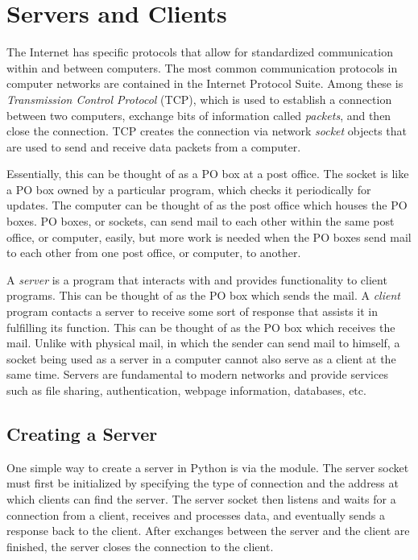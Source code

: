 \section*{Servers and Clients} %

The Internet has specific protocols that allow for standardized communication within and between computers.
The most common communication protocols in computer networks are contained in the Internet Protocol Suite.
Among these is \emph{Transmission Control Protocol} (TCP), which is used to establish a connection between two computers, exchange bits of information called \emph{packets}, and then close the connection.
TCP creates the connection via network \emph{socket} objects that are used to send and receive data packets from a computer.

Essentially, this can be thought of as a PO box at a post office.
The socket is like a PO box owned by a particular program, which checks it periodically for updates.
The computer can be thought of as the post office which houses the PO boxes.
PO boxes, or sockets, can send mail to each other within the same post office, or computer, easily, but more work is needed when the PO boxes send mail to each other from one post office, or computer, to another.

A \emph{server} is a program that interacts with and provides functionality to client programs.
This can be thought of as the PO box which sends the mail.
A \emph{client} program contacts a server to receive some sort of response that assists it in fulfilling its function.
This can be thought of as the PO box which receives the mail.
Unlike with physical mail, in which the sender can send mail to himself, a socket being used as a server in a computer cannot also serve as a client at the same time.
Servers are fundamental to modern networks and provide services such as file sharing, authentication, webpage information, databases, etc.

\subsection*{Creating a Server} %

One simple way to create a server in Python is via the  module.
The server socket must first be initialized by specifying the type of connection and the address at which clients can find the server.
The server socket then listens and waits for a connection from a client, receives and processes data, and eventually sends a response back to the client.
After exchanges between the server and the client are finished, the server closes the connection to the client.


